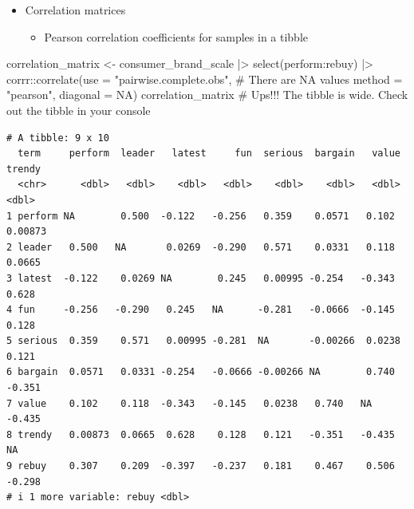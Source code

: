 \documentclass[
  ignorenonframetext,
]{beamer}
\newenvironment{Shaded}{\begin{snugshade}}{\end{snugshade}}
\newcommand{\AttributeTok}[1]{\textcolor[rgb]{0.40,0.45,0.13}{#1}}
\newcommand{\CommentTok}[1]{\textcolor[rgb]{0.37,0.37,0.37}{#1}}
\newcommand{\ConstantTok}[1]{\textcolor[rgb]{0.56,0.35,0.01}{#1}}
\newcommand{\FunctionTok}[1]{\textcolor[rgb]{0.28,0.35,0.67}{#1}}
\newcommand{\NormalTok}[1]{\textcolor[rgb]{0.00,0.23,0.31}{#1}}
\newcommand{\OtherTok}[1]{\textcolor[rgb]{0.00,0.23,0.31}{#1}}
\newcommand{\SpecialCharTok}[1]{\textcolor[rgb]{0.37,0.37,0.37}{#1}}
\newcommand{\StringTok}[1]{\textcolor[rgb]{0.13,0.47,0.30}{#1}}
\providecommand{\tightlist}{%
  \setlength{\itemsep}{0pt}\setlength{\parskip}{0pt}}\usepackage{longtable,booktabs,array}
\begin{document}
\begin{frame}[fragile]{}
\label{section-6}
\begin{itemize}
\item
  Correlation matrices

  \begin{itemize}
  \tightlist
  \item
    Pearson correlation coefficients for samples in a tibble
  \end{itemize}
\end{itemize}

\tiny

\begin{Shaded}
\begin{Highlighting}[]
\NormalTok{correlation\_matrix }\OtherTok{\textless{}{-}}\NormalTok{ consumer\_brand\_scale }\SpecialCharTok{|\textgreater{}} 
  \FunctionTok{select}\NormalTok{(perform}\SpecialCharTok{:}\NormalTok{rebuy) }\SpecialCharTok{|\textgreater{}} 
\NormalTok{  corrr}\SpecialCharTok{::}\FunctionTok{correlate}\NormalTok{(}\AttributeTok{use =} \StringTok{"pairwise.complete.obs"}\NormalTok{, }\CommentTok{\# There are NA values}
                   \AttributeTok{method =} \StringTok{"pearson"}\NormalTok{,}
                   \AttributeTok{diagonal =} \ConstantTok{NA}\NormalTok{)}
\NormalTok{correlation\_matrix }\CommentTok{\# Ups!!! The tibble is wide. Check out the tibble in your console}
\end{Highlighting}
\end{Shaded}

\begin{verbatim}
# A tibble: 9 x 10
  term     perform  leader   latest     fun  serious  bargain   value   trendy
  <chr>      <dbl>   <dbl>    <dbl>   <dbl>    <dbl>    <dbl>   <dbl>    <dbl>
1 perform NA        0.500  -0.122   -0.256   0.359    0.0571   0.102   0.00873
2 leader   0.500   NA       0.0269  -0.290   0.571    0.0331   0.118   0.0665 
3 latest  -0.122    0.0269 NA        0.245   0.00995 -0.254   -0.343   0.628  
4 fun     -0.256   -0.290   0.245   NA      -0.281   -0.0666  -0.145   0.128  
5 serious  0.359    0.571   0.00995 -0.281  NA       -0.00266  0.0238  0.121  
6 bargain  0.0571   0.0331 -0.254   -0.0666 -0.00266 NA        0.740  -0.351  
7 value    0.102    0.118  -0.343   -0.145   0.0238   0.740   NA      -0.435  
8 trendy   0.00873  0.0665  0.628    0.128   0.121   -0.351   -0.435  NA      
9 rebuy    0.307    0.209  -0.397   -0.237   0.181    0.467    0.506  -0.298  
# i 1 more variable: rebuy <dbl>
\end{verbatim}
\end{frame}
\end{document}
